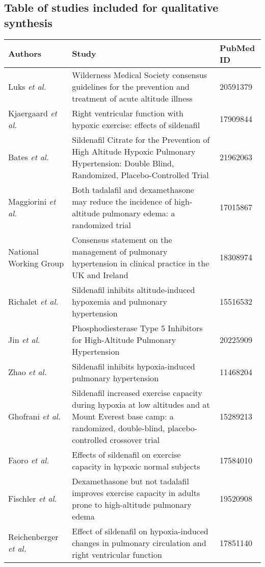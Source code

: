 \documentclass[12pt,a4paper]{article}
\begin{document}
\subsection*{Table of studies included for qualitative synthesis}
\begin{longtabu} to\linewidth{X[l] X[2,l] X[l]}
    \toprule
    \rowfont\bfseries Authors & Study & PubMed ID \\
    \midrule
    \endhead
    Luks \emph{et al.}\cite{Luks:2010ht} & Wilderness Medical Society consensus guidelines for the prevention and treatment of acute altitude illness & 20591379 \\
    Kjaergaard \emph{et al.}\cite{Kjaergaard:2007hp} & Right ventricular function with hypoxic exercise: effects of sildenafil & 17909844 \\
    Bates \emph{et al.}\cite{Bates:2011du} & Sildenafil Citrate for the Prevention of High Altitude Hypoxic Pulmonary Hypertension: Double Blind, Randomized, Placebo-Controlled Trial & 21962063 \\
    Maggiorini \emph{et al.}\cite{Maggiorini:2006kz} & Both tadalafil and dexamethasone may reduce the incidence of high-altitude pulmonary edema: a randomized trial & 17015867 \\
    National Working Group\cite{NationalPulmonaryHypertensionCentresoftheUKandIreland:2008jh} & Consensus statement on the management of pulmonary hypertension in clinical practice in the UK and Ireland & 18308974 \\
    Richalet \emph{et al.}\cite{Richalet:2005el} & Sildenafil inhibits altitude-induced hypoxemia and pulmonary hypertension & 15516532 \\
    Jin \emph{et al.}\cite{Jin:2010fc} & Phosphodiesterase Type 5 Inhibitors for High-Altitude Pulmonary Hypertension & 20225909 \\
    Zhao \emph{et al.}\cite{Zhao:2001kj} & Sildenafil inhibits hypoxia-induced pulmonary hypertension & 11468204 \\
    Ghofrani \emph{et al.}\cite{Ghofrani:2004gp} & Sildenafil increased exercise capacity during hypoxia at low altitudes and at Mount Everest base camp: a randomized, double-blind, placebo-controlled crossover trial & 15289213 \\
    Faoro \emph{et al.}\cite{Faoro:2007ji} & Effects of sildenafil on exercise capacity in hypoxic normal subjects & 17584010 \\
    Fischler \emph{et al.}\cite{Fischler:2009ce} & Dexamethasone but not tadalafil improves exercise capacity in adults prone to high-altitude pulmonary edema & 19520908 \\
    Reichenberger \emph{et al.}\cite{Reichenberger:2007bw} & Effect of sildenafil on hypoxia-induced changes in pulmonary circulation and right ventricular function & 17851140 \\
    \bottomrule
\end{longtabu}
\end{document}
